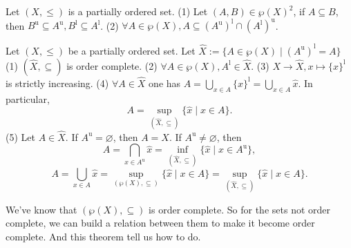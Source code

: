 \begin{lemmaenv}
    Let $(X, \le)$ is a partially ordered set.
    \newline
    (1) Let $(A, B)\in \wp(X)^2$,  if $A\subseteq B$,  then $B^\mathrm{u}\subseteq A^\mathrm{u}, B^\mathrm{l}\subseteq A^\mathrm{l}$.
    \newline
    (2) $\forall A\in \wp(X), A\subseteq (A^\mathrm{u})^\mathrm{l}\cap (A^\mathrm{l})^\mathrm{u}$.
\end{lemmaenv}

\begin{theoremenv}
    \quad
    \newline
    Let $(X, \le )$ be a partially ordered set. Let $\hat{X}:=\{A\in \wp (X)\mid (A^\mathrm{u})^\mathrm{l}=A\}$
\newline
(1) $(\hat{X}, \subseteq)$ is order complete.
\newline
(2) $\forall A\in \wp(X), A^\mathrm{l}\in \hat{X}$.
\newline
(3) $X\rightarrow \hat{X}, x\mapsto \{x\}^\mathrm{l}$ is strictly increasing.
\newline
(4) $\forall A\in \hat{X}$ one has $A=\bigcup_{x\in A}\{x\}^\mathrm{l}=\bigcup_{x\in A}\hat{x}$. In particular,  
$$A=\sup_{(\hat{X}, \subseteq)}\{\hat{x}\mid x\in A\}.$$
(5) Let $A\in \hat{X}$. If $A^\mathrm{u}=\varnothing$,  then $A=X$. If $A^\mathrm{u}\not=\varnothing$, then 
$$A=\bigcap_{x\in A^\mathrm{u}}\hat{x}=\inf_{(\hat{X}, \subseteq)}\{\hat{x}\mid x\in A^\mathrm{u}\}, $$
$$A=\bigcup_{x\in A}\hat{x}=\sup_{(\wp(X), \subseteq)}\{\hat{x}\mid x\in A\}=\sup_{(\hat{X}, \subseteq)}\{\hat{x}\mid x \in A\}.$$
\end{theoremenv}
\begin{remark}
    We've know that $(\wp(X), \subseteq)$ is order complete. So for the sets not order complete,  we can build a relation between them to make it become order complete. And this theorem tell us how to do.
\end{remark}
